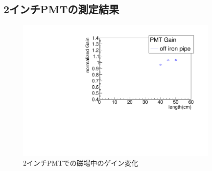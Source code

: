 \subsection{2インチPMTの測定結果}
\begin{figure}[H]
	\centering
		\includegraphics[angle=-90,width=10cm]{fig/iguchi/plot2inchPMT.pdf}
	\caption{2インチPMTでの磁場中のゲイン変化}
	\label{plot2inchoff}
\end{figure}

